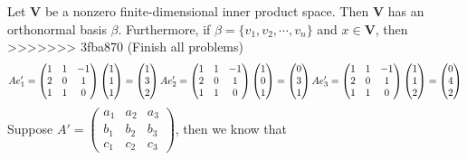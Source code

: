\begin{homeworkProblem}
Let $\mathbf{V}$ be a nonzero finite-dimensional inner product space. Then $\mathbf{V}$ has an orthonormal basis $\beta$. Furthermore, if $\beta = \{v_1, v_2, \cdots, v_n\}$ and $x \in \mathbf{V}$, then
>>>>>>> 3fba870 (Finish all problems)
\[
A e_1' = \begin{pmatrix}
    1 & 1 & -1 \\
    2 & 0 & 1 \\
    1 & 1 & 0
\end{pmatrix}
\begin{pmatrix}
    1 \\
    1 \\
    1
\end{pmatrix} = \begin{pmatrix}
    1 \\
    3 \\
    2
\end{pmatrix}\\
A e_2' = \begin{pmatrix}
    1 & 1 & -1 \\
    2 & 0 & 1 \\
    1 & 1 & 0
\end{pmatrix}
\begin{pmatrix}
    1 \\
    0 \\
    1
\end{pmatrix} = \begin{pmatrix}
    0 \\
    3 \\
    1
\end{pmatrix}\\
A e_3' = \begin{pmatrix}
    1 & 1 & -1 \\
    2 & 0 & 1 \\
    1 & 1 & 0
\end{pmatrix}
\begin{pmatrix}
    1 \\
    1 \\
    2
\end{pmatrix} = \begin{pmatrix}
    0 \\
    4 \\
    2
\end{pmatrix}
\]
Suppose $A' = \left( \begin{smallmatrix}a_1 & a_2 & a_3 \\ b_1 & b_2 & b_3 \\ c_1 & c_2 & c_3 \end{smallmatrix} \right)$, then we know that

\end{homeworkProblem}
